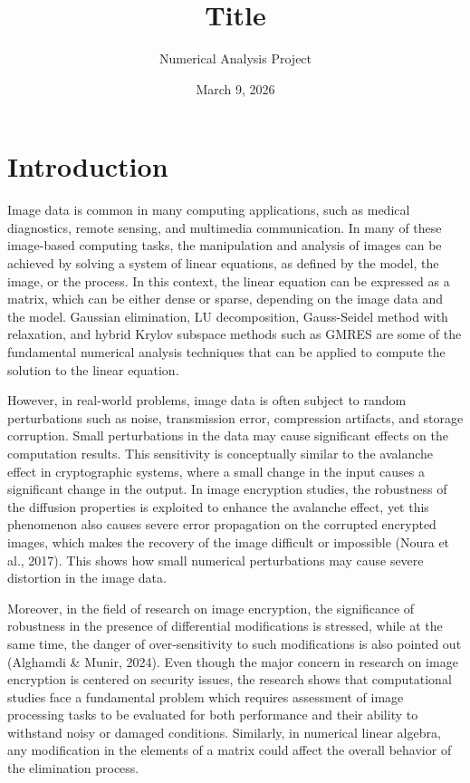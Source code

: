 \documentclass[11pt]{article}
\title{Title}
\author{Numerical Analysis Project}
\date{March 9, 2026}
\begin{document}
\maketitle

\begin{abstract}

\end{abstract}

\section{Introduction}
Image data is common in many computing applications, such as medical diagnostics, remote sensing, and multimedia communication. In many of these image-based computing tasks, the manipulation and analysis of images can be achieved by solving a system of linear equations, as defined by the model, the image, or the process. In this context, the linear equation can be expressed as a matrix, which can be either dense or sparse, depending on the image data and the model. Gaussian elimination, LU decomposition, Gauss-Seidel method with relaxation, and hybrid Krylov subspace methods such as GMRES are some of the fundamental numerical analysis techniques that can be applied to compute the solution to the linear equation.

However, in real-world problems, image data is often subject to random perturbations such as noise, transmission error, compression artifacts, and storage corruption. Small perturbations in the data may cause significant effects on the computation results. This sensitivity is conceptually similar to the avalanche effect in cryptographic systems, where a small change in the input causes a significant change in the output. In image encryption studies, the robustness of the diffusion properties is exploited to enhance the avalanche effect, yet this phenomenon also causes severe error propagation on the corrupted encrypted images, which makes the recovery of the image difficult or impossible (Noura et al., 2017). This shows how small numerical perturbations may cause severe distortion in the image data.

Moreover, in the field of research on image encryption, the significance of robustness in the presence of differential modifications is stressed, while at the same time, the danger of over-sensitivity to such modifications is also pointed out (Alghamdi \& Munir, 2024). Even though the major concern in research on image encryption is centered on security issues, the research shows that computational studies face a fundamental problem which requires assessment of image processing tasks to be evaluated for both performance and their ability to withstand noisy or damaged conditions. Similarly, in numerical linear algebra, any modification in the elements of a matrix could affect the overall behavior of the elimination process.
\end{document}
